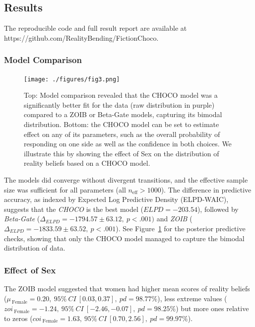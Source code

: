 \documentclass[
  jou,
  floatsintext,
  longtable,
  nolmodern,
  notxfonts,
  notimes,
  colorlinks=true,linkcolor=blue,citecolor=blue,urlcolor=blue]{apa7}
\begin{document}
\subsection{Results}\label{results}

The reproducible code and full result report are available at
https://github.com/RealityBending/FictionChoco.

\subsubsection{Model Comparison}\label{model-comparison}

\begin{figure}[!htbp]

{\caption{{Top: Model comparison revealed that the CHOCO model was a
significantly better fit for the data (raw distribution in purple)
compared to a ZOIB or Beta-Gate models, capturing its bimodal
distribution. Bottom: the CHOCO model can be set to estimate effect on
any of its parameters, such as the overall probability of responding on
one side as well as the confidence in both choices. We illustrate this
by showing the effect of Sex on the distribution of reality beliefs
based on a CHOCO model.}{\label{fig-three}}}}

\texttt{[image: ./figures/fig3.png]}

\end{figure}

The models did converge without divergent transitions, and the effective
sample size was sufficient for all parameters (all
\(n_{\text{eff}} > 1000\)). The difference in predictive accuracy, as
indexed by Expected Log Predictive Density (ELPD-WAIC), suggests that
the \emph{CHOCO} is the best model (\(ELPD = -203.54\)), followed by
\emph{Beta-Gate} (\(\Delta_{ELPD} = -1794.57 \pm 63.12, ~p < .001)\) and
\emph{ZOIB} (\(\Delta_{ELPD} = -1833.59 \pm 63.52, ~p < .001\)). See
Figure~\ref{fig-three} for the posterior predictive checks, showing that
only the CHOCO model managed to capture the bimodal distribution of
data.

\subsubsection{Effect of Sex}\label{effect-of-sex}

The ZOIB model suggested that women had higher mean scores of reality
beliefs
(\(\mu_{~\text{Female}} = 0.20,~95\%~ CI~[0.03, 0.37], ~pd = 98.77\%\)),
less extreme values
(\(zoi_{~\text{Female}} = -1.24,~95\%~ CI~[-2.46, -0.07], ~pd = 98.25\%\))
but more ones relative to zeros
(\(coi_{~\text{Female}} = 1.63,~95\%~ CI~[0.70, 2.56], ~pd = 99.97\%\)).
\end{document}
